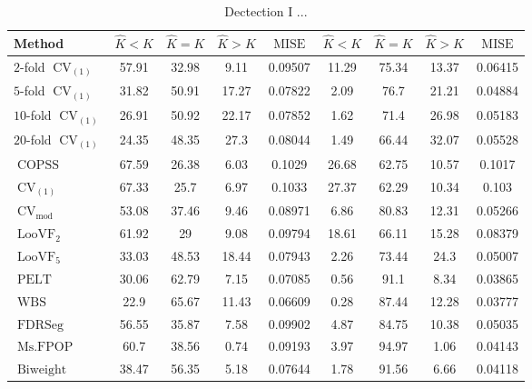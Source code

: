 \begin{table}[ht]
\centering
\begin{tabular}{|l|cccc|cccc|}
  \hline
Method & $\hat{K} < K$ & $\hat{K} = K$ & $\hat{K} > K$ & $\operatorname{MISE}$ & $\hat{K} < K$ & $\hat{K} = K$ & $\hat{K} > K$ & $\operatorname{MISE}$ \\ 
  \hline
$2$-fold $\operatorname{CV}_{(1)}$ & 57.91 & 32.98 &  9.11 & 0.09507 & 11.29 & 75.34 & 13.37 & 0.06415 \\ 
  $5$-fold $\operatorname{CV}_{(1)}$ & 31.82 & 50.91 & 17.27 & 0.07822 &  2.09 &  76.7 & 21.21 & 0.04884 \\ 
  $10$-fold $\operatorname{CV}_{(1)}$ & 26.91 & 50.92 & 22.17 & 0.07852 &  1.62 &  71.4 & 26.98 & 0.05183 \\ 
  $20$-fold $\operatorname{CV}_{(1)}$ & 24.35 & 48.35 &  27.3 & 0.08044 &  1.49 & 66.44 & 32.07 & 0.05528 \\ 
  $\operatorname{COPSS}$ & 67.59 & 26.38 &  6.03 & 0.1029 & 26.68 & 62.75 & 10.57 & 0.1017 \\ 
  $\operatorname{CV}_{(1)}$ & 67.33 &  25.7 &  6.97 & 0.1033 & 27.37 & 62.29 & 10.34 & 0.103 \\ 
  $\operatorname{CV}_{\operatorname{mod}}$ & 53.08 & 37.46 &  9.46 & 0.08971 &  6.86 & 80.83 & 12.31 & 0.05266 \\ 
  $\operatorname{LooVF}_2$ & 61.92 &    29 &  9.08 & 0.09794 & 18.61 & 66.11 & 15.28 & 0.08379 \\ 
  $\operatorname{LooVF}_5$ & 33.03 & 48.53 & 18.44 & 0.07943 &  2.26 & 73.44 &  24.3 & 0.05007 \\ 
  $\operatorname{PELT}$ & 30.06 & 62.79 &  7.15 & 0.07085 &  0.56 &  91.1 &  8.34 & 0.03865 \\ 
  $\operatorname{WBS}$ &  22.9 & 65.67 & 11.43 & 0.06609 &  0.28 & 87.44 & 12.28 & 0.03777 \\ 
  $\operatorname{FDRSeg}$ & 56.55 & 35.87 &  7.58 & 0.09902 &  4.87 & 84.75 & 10.38 & 0.05035 \\ 
  $\operatorname{Ms.FPOP}$ &  60.7 & 38.56 &  0.74 & 0.09193 &  3.97 & 94.97 &  1.06 & 0.04143 \\ 
  $\operatorname{Biweight}$ & 38.47 & 56.35 &  5.18 & 0.07644 &  1.78 & 91.56 &  6.66 & 0.04118 \\ 
   \hline
\end{tabular}
\caption{Dectection I ...} 
\end{table}
